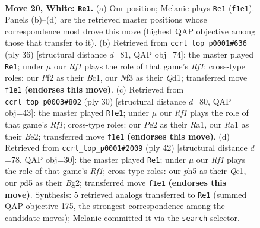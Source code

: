 \documentclass[11pt]{article}
\begin{document}
\clearpage

\begin{figure}[p]\centering
\begin{subfigure}{0.46\textwidth}\centering
\resizebox{\linewidth}{!}{%
\newchessgame
\chessboard[
  setfen={r1b1k2r/2p1qp2/2n2np1/3p3p/p2P4/P4NP1/3BPPBP/R2Q1RK1 w q - 8 20},
  showmover=false,
  pgfstyle=straightmove, color=movearrow, markmove={f1-e1}
]}
\caption{}
\end{subfigure}\hfill
\begin{subfigure}{0.46\textwidth}\centering
\resizebox{\linewidth}{!}{%
\newchessgame
\chessboard[
  setfen={1k1r1b1r/1pp1q1pb/p1n2p1p/P7/2BP4/2P1PN2/6PP/R1BQ1RK1 w - - 0 19},
  showmover=false,
  pgfstyle=straightmove, color=movearrow, markmove={f1-e1}
]}
\caption{}
\end{subfigure}
\\[4pt]
\begin{subfigure}{0.46\textwidth}\centering
\resizebox{\linewidth}{!}{%
\newchessgame
\chessboard[
  setfen={r1br2k1/p1p1qppp/1p3n2/3p4/3P4/2N1P2P/PPQ1BPP1/R4RK1 w - - 3 16},
  showmover=false,
  pgfstyle=straightmove, color=movearrow, markmove={f1-e1}
]}
\caption{}
\end{subfigure}\hfill
\begin{subfigure}{0.46\textwidth}\centering
\resizebox{\linewidth}{!}{%
\newchessgame
\chessboard[
  setfen={r4rk1/p1q1npp1/b4n1p/2pp4/1P6/P1N2NP1/4PPBP/1RQ2RK1 w - - 1 22},
  showmover=false,
  pgfstyle=straightmove, color=movearrow, markmove={f1-e1}
]}
\caption{}
\end{subfigure}
\caption{\textbf{Move 20, White: \texttt{Re1}.} (a) Our position; Melanie plays \texttt{Re1} (\texttt{f1e1}). Panels (b)--(d) are the retrieved master positions whose correspondence most drove this move (highest QAP objective among those that transfer to it). (b) Retrieved from \texttt{ccrl\_top\_p0001\#636} (ply 36) [structural distance $d$=81, QAP obj=74]: the master played \texttt{Re1}; under $\mu$ our \emph{Rf1} plays the role of that game's \emph{Rf1}; cross-type roles: our \emph{P}f2 as their \emph{B}c1, our \emph{N}f3 as their \emph{Q}d1; transferred move \texttt{f1e1} \textbf{(endorses this move)}. (c) Retrieved from \texttt{ccrl\_top\_p0003\#802} (ply 30) [structural distance $d$=80, QAP obj=43]: the master played \texttt{Rfe1}; under $\mu$ our \emph{Rf1} plays the role of that game's \emph{Rf1}; cross-type roles: our \emph{P}e2 as their \emph{R}a1, our \emph{R}a1 as their \emph{B}e2; transferred move \texttt{f1e1} \textbf{(endorses this move)}. (d) Retrieved from \texttt{ccrl\_top\_p0001\#2009} (ply 42) [structural distance $d$=78, QAP obj=30]: the master played \texttt{Re1}; under $\mu$ our \emph{Rf1} plays the role of that game's \emph{Rf1}; cross-type roles: our \emph{p}h5 as their \emph{Q}c1, our \emph{p}d5 as their \emph{B}g2; transferred move \texttt{f1e1} \textbf{(endorses this move)}. Synthesis: 5 retrieved analogs transferred to \texttt{Re1} (summed QAP objective 175, the strongest correspondence among the candidate moves); Melanie committed it via the \texttt{search} selector.}
\label{fig:thought-m38}
\end{figure}
\end{document}
